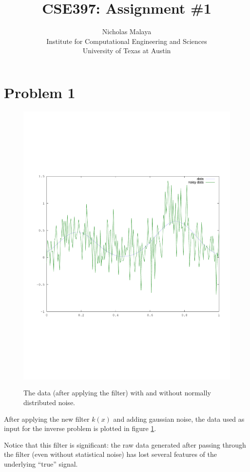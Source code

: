 \documentclass{article}
\title{\bf{CSE397: Assignment \#1}}
\author{Nicholas Malaya \\ Institute for Computational Engineering and Sciences \\ University of Texas at Austin} \date{}
\begin{document}
\maketitle

\newpage
\section{Problem 1}

\begin{figure}[!htb]
  \includegraphics[scale=.5]{plots/data.pdf}
  \label{fig:data}
  \caption{The data (after applying the filter) with and without
 normally distributed noise. } 
\end{figure}

After applying the new filter $k(x)$ and adding gaussian noise, the data
used as input for the inverse problem is plotted in figure
\ref{fig:data}. 

Notice that this filter is significant: the raw data generated after
passing through the filter (even without statistical noise) has lost
several features of the underlying ``true'' signal. 
\end{document}
